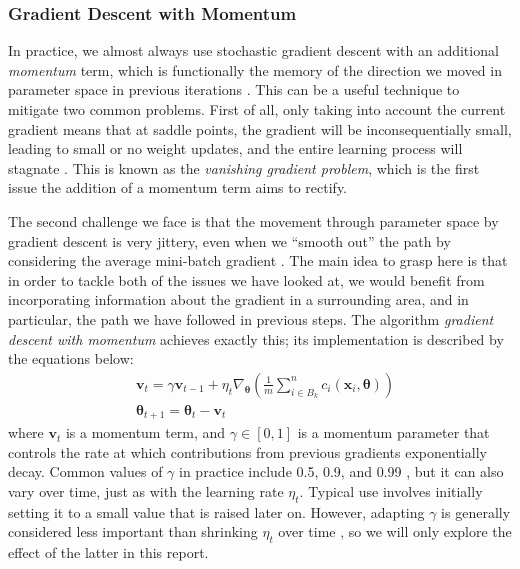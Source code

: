 \subsubsection{Gradient Descent with Momentum}
In practice, we almost always use stochastic gradient descent with an additional \emph{momentum} term, which is functionally the memory of the direction we moved in parameter space in previous iterations \cite{MHJweek39}. This can be a useful technique to mitigate two common problems. First of all, only taking into account the current gradient means that at saddle points, the gradient will be inconsequentially small, leading to small or no weight updates, and the entire learning process will stagnate \cite{gradientdescentwithmomentum}. This is known as the \emph{vanishing gradient problem}, which is the first issue the addition of a momentum term aims to rectify. 

The second challenge we face is that the movement through parameter space by gradient descent is very jittery, even when we ``smooth out'' the path by considering the average mini-batch gradient \cite{gradientdescentwithmomentum}. The main idea to grasp here is that in order to tackle both of the issues we have looked at, we would benefit from incorporating information about the gradient in a surrounding area, and in particular, the path we have followed in previous steps. The algorithm \emph{gradient descent with momentum} achieves exactly this; its implementation is described by the equations below:
\begin{align*}
    &\boldsymbol v_t = \gamma \boldsymbol v_{t-1} + \eta_t \nabla_{\boldsymbol{\theta}} \left ( \frac{1}{m} \sum_{i\in B_k}^n c_i (\boldsymbol{x}_i, \boldsymbol{\theta} ) \right )
    \\
    &\boldsymbol{\theta}_{t+1} = \boldsymbol{\theta}_t - \boldsymbol v_t
\end{align*}
where $\boldsymbol v_t$ is a momentum term, and $\gamma \in [0,1]$ is a momentum parameter that controls the rate at which contributions from previous gradients exponentially decay. Common values of $\gamma$ in practice include 0.5, 0.9, and 0.99 \cite{deeplearningbookChapter8}, but it can also vary over time, just as with the learning rate $\eta_t$. Typical use involves initially setting it to a small value that is raised later on. However, adapting $\gamma$ is generally considered less important than shrinking $\eta_t$ over time \cite{deeplearningbookChapter8}, so we will only explore the effect of the latter in this report. 

